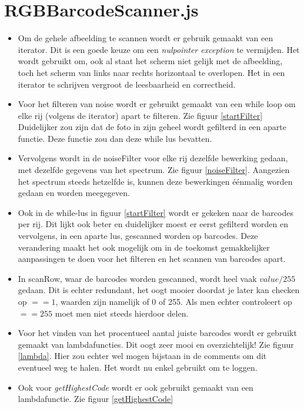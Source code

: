 \documentclass[a4paper,11pt]{article}
\begin{document}
\section{RGBBarcodeScanner.js}
\begin{itemize}
	\item Om de gehele afbeelding te scannen wordt er gebruik gemaakt van een iterator. Dit is een goede keuze om een {\it nulpointer exception} te vermijden. Het wordt gebruikt om, ook al staat het scherm niet gelijk met de afbeelding, toch  het scherm van links naar rechts horizontaal te overlopen. Het in een iterator te schrijven vergroot de leesbaarheid en correctheid.
	\item Voor het filteren van noise wordt er gebruikt gemaakt van een while loop om elke rij (volgens de iterator) apart te filteren. Zie figuur \ref{startFilter} Duidelijker zou zijn dat de foto in zijn geheel wordt gefilterd in een aparte functie. Deze functie zou dan deze while lus bevatten.
	\item Vervolgens wordt in de noiseFilter voor elke rij dezelfde bewerking gedaan, met dezelfde gegevens van het spectrum. Zie figuur \ref{noiseFilter}. Aangezien het spectrum steeds hetzelfde is, kunnen deze bewerkingen éénmalig worden gedaan en worden meegegeven.
	\item Ook in de while-lus in figuur \ref{startFilter} wordt er gekeken naar de barcodes per rij. Dit lijkt ook beter en duidelijker moest er eerst gefilterd worden en vervolgens, in een aparte lus, gescanned worden op barcodes. Deze verandering maakt het ook mogelijk om in de toekomst gemakkelijker aanpassingen te doen voor het filteren en het scannen van barcodes apart.
	\item In scanRow, waar de barcodes worden gescanned, wordt heel vaak $ value / 255$ gedaan. Dit is echter redundant, het oogt mooier doordat je later kan checken op $==1$, waarden zijn namelijk of 0 of 255. Als men echter controleert op $==255$ moet men niet steeds hierdoor delen.
	\item Voor het vinden van het procentueel aantal juiste barcodes wordt er gebruikt gemaakt van lambdafuncties. Dit oogt zeer mooi en overzichtelijk! Zie figuur \ref{lambda}. Hier zou echter wel mogen bijstaan in de comments om dit eventueel weg te halen. Het wordt nu enkel gebruikt om te loggen.
	\item Ook voor {\it getHighestCode} wordt er ook gebruikt gemaakt van een lambdafunctie. Zie figuur \ref{getHighestCode}
\end{itemize}
\end{document}

